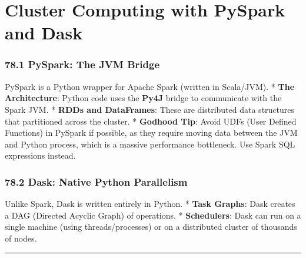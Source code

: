 \hypertarget{cluster-computing-with-pyspark-and-dask}{%
\chapter{Cluster Computing with PySpark and
Dask}\label{cluster-computing-with-pyspark-and-dask}}

\hypertarget{pyspark-the-jvm-bridge}{%
\subsection{78.1 PySpark: The JVM Bridge}\label{pyspark-the-jvm-bridge}}

PySpark is a Python wrapper for Apache Spark (written in Scala/JVM). *
\textbf{The Architecture}: Python code uses the \textbf{Py4J} bridge to
communicate with the Spark JVM. * \textbf{RDDs and DataFrames}: These
are distributed data structures that partitioned across the cluster. *
\textbf{Godhood Tip}: Avoid UDFs (User Defined Functions) in PySpark if
possible, as they require moving data between the JVM and Python
process, which is a massive performance bottleneck. Use Spark SQL
expressions instead.

\hypertarget{dask-native-python-parallelism}{%
\subsection{78.2 Dask: Native Python
Parallelism}\label{dask-native-python-parallelism}}

Unlike Spark, Dask is written entirely in Python. * \textbf{Task
Graphs}: Dask creates a DAG (Directed Acyclic Graph) of operations. *
\textbf{Schedulers}: Dask can run on a single machine (using
threads/processes) or on a distributed cluster of thousands of nodes.

\begin{center}\rule{0.5\linewidth}{0.5pt}\end{center}
